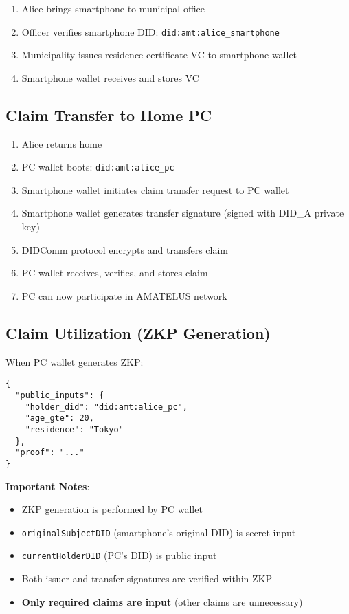 \begin{enumerate}
  \item Alice brings smartphone to municipal office
  \item Officer verifies smartphone DID: \texttt{did:amt:alice\_smartphone}
  \item Municipality issues residence certificate VC to smartphone wallet
  \item Smartphone wallet receives and stores VC
\end{enumerate}

\subsection{Claim Transfer to Home PC}

\begin{enumerate}
  \item Alice returns home
  \item PC wallet boots: \texttt{did:amt:alice\_pc}
  \item Smartphone wallet initiates claim transfer request to PC wallet
  \item Smartphone wallet generates transfer signature (signed with DID\_A private key)
  \item DIDComm protocol encrypts and transfers claim
  \item PC wallet receives, verifies, and stores claim
  \item PC can now participate in AMATELUS network
\end{enumerate}

\subsection{Claim Utilization (ZKP Generation)}

When PC wallet generates ZKP:

\begin{verbatim}
{
  "public_inputs": {
    "holder_did": "did:amt:alice_pc",
    "age_gte": 20,
    "residence": "Tokyo"
  },
  "proof": "..."
}
\end{verbatim}

\textbf{Important Notes}:
\begin{itemize}
  \item ZKP generation is performed by PC wallet
  \item \texttt{originalSubjectDID} (smartphone's original DID) is secret input
  \item \texttt{currentHolderDID} (PC's DID) is public input
  \item Both issuer and transfer signatures are verified within ZKP
  \item \textbf{Only required claims are input} (other claims are unnecessary)
\end{itemize}

